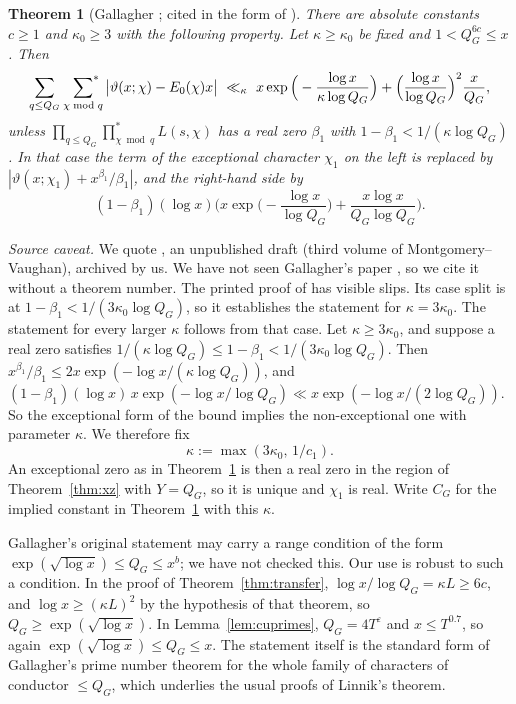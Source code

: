 \documentclass[11pt,reqno]{amsart}
\newtheorem{theorem}{Theorem}[section]
\theoremstyle{definition}
\begin{document}
\begin{theorem}[Gallagher {\cite{Gallagher}}; cited in the form of {\cite[Thm.~28.19]{MV3}}]\label{thm:G}
There are absolute constants $c\ge1$ and $\kappa_0\ge3$ with the following
property.  Let $\kappa\ge\kappa_0$ be fixed and $1<Q_G^{6c}\le x$.  Then
\[
 \sum_{q\le Q_G}\ \sideset{}{^*}\sum_{\chi\bmod q}\big|\vartheta(x;\chi)-E_0(\chi)x\big|
 \ \ll_\kappa\ x\exp\Big(-\frac{\log x}{\kappa\log Q_G}\Big)+\Big(\frac{\log x}{\log Q_G}\Big)^2\frac x{Q_G},
\]
unless $\prod_{q\le Q_G}\prod^*_{\chi\bmod q}L(s,\chi)$ has a real zero $\beta_1$ with
$1-\beta_1<1/(\kappa\log Q_G)$.  In that case the term of the exceptional
character $\chi_1$ on the left is replaced by
$|\vartheta(x;\chi_1)+x^{\beta_1}/\beta_1|$, and the right-hand side by
\[
 (1-\beta_1)(\log x)\Big(x\exp\Big(-\frac{\log x}{\log Q_G}\Big)+\frac{x\log x}{Q_G\log Q_G}\Big).
\]
\end{theorem}

\emph{Source caveat.}  We quote \cite{MV3}, an unpublished draft (third volume
of Montgomery--Vaughan), archived by us.  We have not seen Gallagher's paper
\cite{Gallagher}, so we cite it without a theorem number.  The printed proof
of \cite[Thm.~28.19]{MV3} has visible slips.  Its case split is at
$1-\beta_1<1/(3\kappa_0\log Q_G)$, so it establishes the statement for
$\kappa=3\kappa_0$.  The statement for every larger $\kappa$ follows from that
case.  Let $\kappa\ge3\kappa_0$, and suppose a real zero satisfies
$1/(\kappa\log Q_G)\le1-\beta_1<1/(3\kappa_0\log Q_G)$.  Then
$x^{\beta_1}/\beta_1\le2x\exp(-\log x/(\kappa\log Q_G))$, and
$(1-\beta_1)(\log x)\,x\exp(-\log x/\log Q_G)\ll x\exp(-\log x/(2\log Q_G))$.
So the exceptional form of the bound implies the non-exceptional one with
parameter $\kappa$.  We therefore fix
\[
 \kappa:=\max(3\kappa_0,\,1/c_1).
\]
An exceptional zero as in Theorem~\ref{thm:G} is then a real zero in the
region of Theorem~\ref{thm:xz} with $Y=Q_G$, so it is unique and $\chi_1$ is
real.  Write $C_G$ for the implied constant in Theorem~\ref{thm:G} with this
$\kappa$.

Gallagher's original statement may carry a range condition of the form
$\exp(\sqrt{\log x})\le Q_G\le x^{b}$; we have not checked this.  Our use is
robust to such a condition.  In the proof of Theorem~\ref{thm:transfer},
$\log x/\log Q_G=\kappa L\ge6c$, and $\log x\ge(\kappa L)^2$ by the
hypothesis of that theorem, so $Q_G\ge\exp(\sqrt{\log x})$.  In Lemma~\ref{lem:cuprimes}, $Q_G=4T^{\varepsilon}$ and
$x\le T^{0.7}$, so again $\exp(\sqrt{\log x})\le Q_G\le x$.  The statement
itself is the standard form of Gallagher's prime number theorem for the
whole family of characters of conductor $\le Q_G$, which underlies the usual
proofs of Linnik's theorem.
\end{document}
